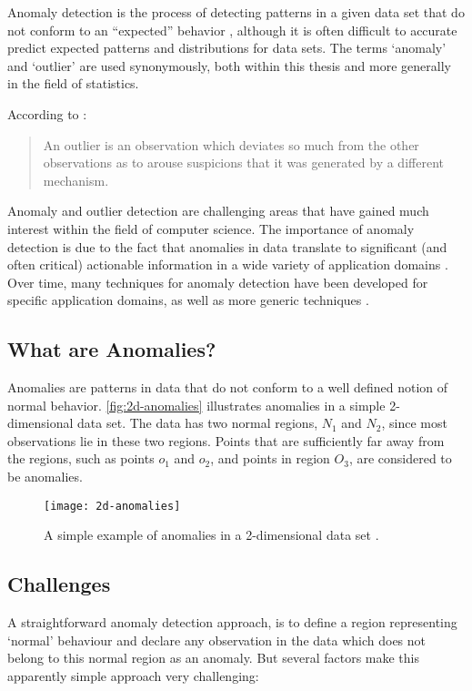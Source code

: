 Anomaly detection is the process of detecting patterns in a given data set that
do not conform to an ``expected'' behavior \cite{Chandola:2007}, although it is
often difficult to accurate predict expected patterns and distributions for data
sets. The terms `anomaly' and `outlier' are used synonymously, both within this
thesis and more generally in the field of statistics.

According to \citeauthor{Hawkins:1980} \cite{Hawkins:1980}:
\begin{quote}
An outlier is an observation which deviates so much from the other observations
as to arouse suspicions that it was generated by a different mechanism.
\end{quote}

Anomaly and outlier detection are challenging areas that have gained much
interest within the field of computer science. The importance of anomaly
detection is due to the fact that anomalies in data translate to significant
(and often critical) actionable information in a wide variety of application
domains \cite{Chandola:2007}. Over time, many techniques for anomaly detection
have been developed for specific application domains, as well as more generic
techniques \cite{Chandola:2007}.

\subsection{What are Anomalies?}
\label{anomalyDetection:whatAreAnomalies}
Anomalies are patterns in data that do not conform to a well defined notion of
normal behavior. \autoref{fig:2d-anomalies} illustrates anomalies in a simple
2-dimensional data set. The data has two normal regions, $N_{1}$ and $N_{2}$,
since most observations lie in these two regions. Points that are sufficiently
far away from the regions, such as points $o_{1}$ and $o_{2}$, and points in
region $O_{3}$, are considered to be anomalies.

\begin{figure}
    \centering
    \texttt{[image: 2d-anomalies]}
    \caption[A simple example of anomalies in a 2-dimensional data set.]
        {A simple example of anomalies in a 2-dimensional data set
        \cite{Chandola:2007}.}
    \label{fig:2d-anomalies}
\end{figure}

\subsection{Challenges}
\label{anomalyDetection:Challenges}
A straightforward anomaly detection approach, is to define a region representing
`normal' behaviour and declare any observation in the data which does not belong
to this normal region as an anomaly. But several factors make this apparently
simple approach very challenging:

